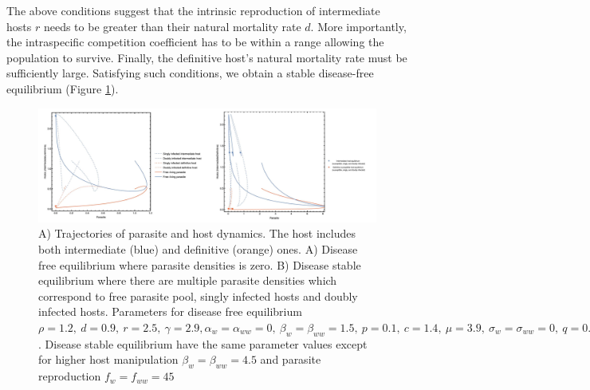 \documentclass[11pt]{article}
\begin{document}
The above conditions suggest that the intrinsic reproduction of intermediate hosts $r$ needs to be greater than their natural mortality rate $d$. 
More importantly, the intraspecific competition coefficient has to be within a range allowing the population to survive.
Finally, the definitive host's natural mortality rate must be sufficiently large. 
Satisfying such conditions, we obtain a stable disease-free equilibrium (Figure \ref{fig:ecotraject:nonlinear}).

\begin{figure}[!ht]
\includegraphics[width=\textwidth]{Figures/ecotraject_nonlinear.jpeg}
\caption{A) Trajectories of parasite and host dynamics. The host includes both intermediate (blue) and definitive (orange) ones. A) Disease free equilibrium where parasite densities is zero. B) Disease stable equilibrium where there are multiple parasite densities which correspond to free parasite pool, singly infected hosts and doubly infected hosts. Parameters for disease free equilibrium $\rho =  1.2, \ d = 0.9, \  r = 2.5, \ \gamma =  2.9, \alpha_w = \alpha_{ww} =  0, \ \beta_w = \beta_{ww} = 1.5, \ p = 0.1, \  c = 1.4, \ \mu = 3.9, \ \sigma_w = \sigma_{ww} = 0, \ q = 0.01, \ f_w = f_{ww} = 7.5, \ \delta = 0.9, \ k = 0.26$. Disease stable equilibrium have the same parameter values except for higher host manipulation $ \beta_w =  \beta_{ww} = 4.5$ and parasite reproduction $ f_w  = f_{ww} = 45$}
\label{fig:ecotraject:nonlinear}
\end{figure}
\end{document}

